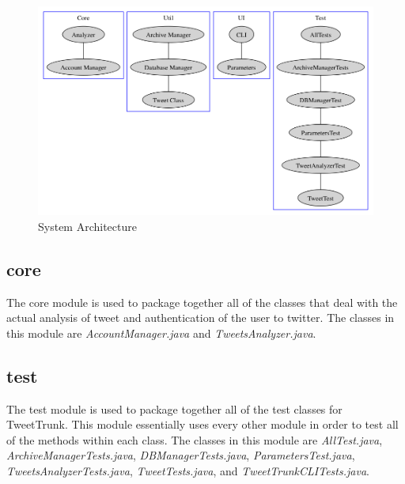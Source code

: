 \documentclass[a4paper, 12pt]{article}
\begin{document}
\begin{adjustwidth}{2em}{0pt}

\begin{figure}[ht!]
\includegraphics[scale=.5]{architecture.png}
\caption{System Architecture}
\label{Examples}
\end{figure}


\subsection{core} \label{sec:archd}
\begin{adjustwidth}{2em}{0pt}
The core module is used to package together all of the classes that deal with the actual analysis of tweet and authentication of the user to twitter. The classes in this module are \textit{AccountManager.java} and \textit{TweetsAnalyzer.java}. 

\end{adjustwidth}


\subsection{test} \label{sec:archa}
\begin{adjustwidth}{2em}{0pt}
The test module is used to package together all of the test classes for TweetTrunk. This module essentially uses every other module in order to test all of the methods within each class. The classes in this module are \textit{AllTest.java}, \textit{ArchiveManagerTests.java}, \textit{DBManagerTests.java}, \textit{ParametersTest.java}, \textit{TweetsAnalyzerTests.java}, \textit{TweetTests.java}, and \textit{TweetTrunkCLITests.java}.

\end{adjustwidth}



\end{adjustwidth}
\end{document}
